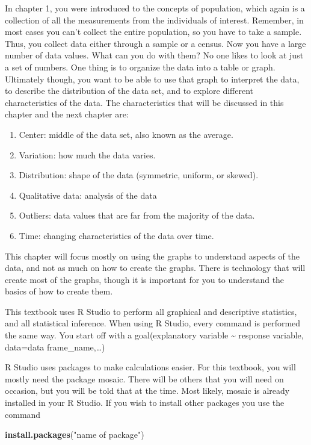 \documentclass[
]{book}
\newenvironment{Shaded}{\begin{snugshade}}{\end{snugshade}}
\newcommand{\KeywordTok}[1]{\textcolor[rgb]{0.13,0.29,0.53}{\textbf{#1}}}
\newcommand{\NormalTok}[1]{#1}
\newcommand{\StringTok}[1]{\textcolor[rgb]{0.31,0.60,0.02}{#1}}
\providecommand{\tightlist}{%
  \setlength{\itemsep}{0pt}\setlength{\parskip}{0pt}}
\begin{document}
In chapter 1, you were introduced to the concepts of population, which again is a collection of all the measurements from the individuals of interest. Remember, in most cases you can't collect the entire
population, so you have to take a sample. Thus, you collect data either through a sample or a census. Now you have a large number of data values. What can you do with them? No one likes to look at just a set of numbers. One thing is to organize the data into a table or graph. Ultimately though, you want to be able to use that graph to interpret the data, to describe the distribution of the data set, and to explore different characteristics of the data. The characteristics that will be discussed in this chapter and the next chapter are:

\begin{enumerate}
\def\labelenumi{\arabic{enumi}.}
\tightlist
\item
  Center: middle of the data set, also known as the average.
\item
  Variation: how much the data varies.
\item
  Distribution: shape of the data (symmetric, uniform, or skewed).
\item
  Qualitative data: analysis of the data
\item
  Outliers: data values that are far from the majority of the data.
\item
  Time: changing characteristics of the data over time.
\end{enumerate}

This chapter will focus mostly on using the graphs to understand aspects of the data, and not as much on how to create the graphs. There is technology that will create most of the graphs, though it is important for you to understand the basics of how to create them.

This textbook uses R Studio to perform all graphical and descriptive statistics, and all statistical inference. When using R Studio, every command is performed the same way. You start off with a
goal(explanatory variable \textasciitilde{} response variable, data=data frame\_name,\ldots)

R Studio uses packages to make calculations easier. For this textbook, you will mostly need the package mosaic. There will be others that you will need on occasion, but you will be told that at the time. Most likely, mosaic is already installed in your R Studio. If you wish to install other packages you use the command

\begin{Shaded}
\begin{Highlighting}[]
\KeywordTok{install.packages}\NormalTok{(}\StringTok{"name of package"}\NormalTok{)}
\end{Highlighting}
\end{Shaded}
\end{document}
